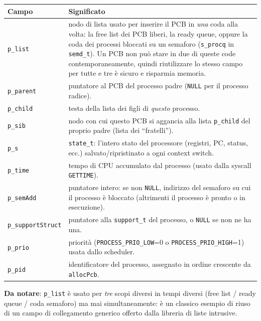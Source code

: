 \documentclass[11pt,a4paper]{article}
\newcommand{\code}[1]{\texttt{#1}}
\begin{document}
\begin{center}
\begin{tabular}{@{}lp{10.3cm}@{}}
\toprule
\textbf{Campo} & \textbf{Significato} \\
\midrule
\code{p\_list} & nodo di lista usato per inserire il PCB in \emph{una} coda alla
  volta: la free list dei PCB liberi, la ready queue, oppure la coda dei
  processi bloccati su un semaforo (\code{s\_procq} in \code{semd\_t}). Un
  PCB non può stare in due di queste code contemporaneamente, quindi
  riutilizzare lo stesso campo per tutte e tre è sicuro e risparmia memoria. \\
\code{p\_parent} & puntatore al PCB del processo padre (\code{NULL} per il
  processo radice). \\
\code{p\_child} & testa della lista dei figli di \emph{questo} processo. \\
\code{p\_sib} & nodo con cui questo PCB si aggancia alla lista \code{p\_child}
  del proprio padre (lista dei ``fratelli''). \\
\code{p\_s} & \code{state\_t}: l'intero stato del processore (registri,
  PC, status, ecc.) salvato/ripristinato a ogni context switch. \\
\code{p\_time} & tempo di CPU accumulato dal processo (usato dalla syscall
  \code{GETTIME}). \\
\code{p\_semAdd} & puntatore intero: se non \code{NULL}, indirizzo del
  semaforo su cui il processo è bloccato (altrimenti il processo è pronto o
  in esecuzione). \\
\code{p\_supportStruct} & puntatore alla \code{support\_t} del processo, o
  \code{NULL} se non ne ha una. \\
\code{p\_prio} & priorità (\code{PROCESS\_PRIO\_LOW}=0 o
  \code{PROCESS\_PRIO\_HIGH}=1) usata dallo scheduler. \\
\code{p\_pid} & identificatore del processo, assegnato in ordine crescente
  da \code{allocPcb}. \\
\bottomrule
\end{tabular}
\end{center}

\textbf{Da notare}: \code{p\_list} è usato per \emph{tre} scopi diversi in
tempi diversi (free list / ready queue / coda semaforo) ma mai
simultaneamente: è un classico esempio di riuso di un campo di collegamento
generico offerto dalla libreria di liste intrusive.
\end{document}
